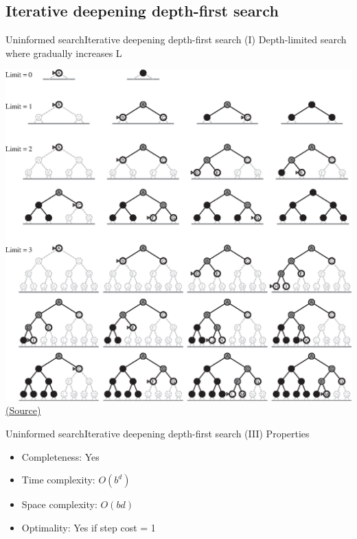 \documentclass[10pt,compress]{beamer} %
\begin{document}
\subsection{Iterative deepening depth-first search}

\begin{frame}{Uninformed search}{Iterative deepening depth-first search (I)}
    Depth-limited search where gradually increases L
\end{frame}

\begin{frame}
      \begin{center}
          \includegraphics[width=\linewidth]{figs/ids-progress.eps}\\
          \tiny{\href{http://aima.cs.berkeley.edu/index.html}{(Source)}}
      \end{center}
\end{frame}

\begin{frame}{Uninformed search}{Iterative deepening depth-first search (III)}
      Properties
      \begin{itemize}
        \item Completeness: Yes
        \item Time complexity: $O(b^{d})$
        \item Space complexity: $O(bd)$
        \item Optimality: Yes if step cost = 1
      \end{itemize}
\end{frame}
\end{document}
